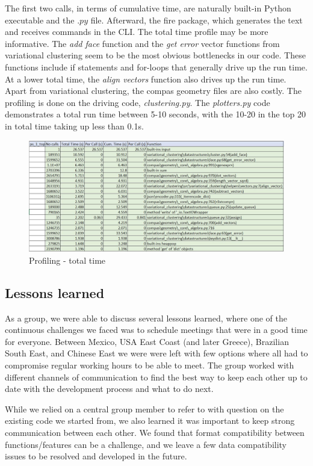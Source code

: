 \documentclass[11pt]{article}
\begin{document}
The first two calls, in terms of cumulative time, are naturally built-in Python executable and the $.py$ file. Afterward, the fire package, which generates the text and receives commands in the CLI. The total time profile may be more informative. The \emph{add face} function and the \emph{get error} vector functions from variational clustering seem to be the most obvious bottlenecks in our code. These functions include if statements and for-loops that generally drive up the run time. At a lower total time, the \emph{align vectors} function also drives up the run time. Apart from variational clustering, the compas geometry files are also costly. The profiling is done on the driving code, \emph{clustering.py}. The \emph{plotters.py} code demonstrates a total run time between 5-10 seconds, with the 10-20 in the top 20 in total time taking up less than 0.1s.

\begin{figure}[H]
    \centering
    \includegraphics[scale=0.7]{images/Profiling2.JPG}
	\caption{Profiling - total time}
	\label{fig:tottime}
\end{figure}


\subsection{Lessons learned}

As a group, we were able to discuss several lessons learned, where one of the continuous challenges we faced was to schedule meetings that were in a good time for everyone. Between Mexico, USA East Coast (and later Greece), Brazilian South East, and Chinese East we were were left with few options where all had to compromise regular working hours to be able to meet. The group worked with different channels of communication to find the best way to keep each other up to date with the development process and what to do next.

While we relied on a central group member to refer to with question on the existing code we started from, we also learned it was important to keep strong communication between each other. We found that format compatibility between functions/features can be a challenge, and we leave a few data compatibility issues to be resolved and developed in the future.
\end{document}
